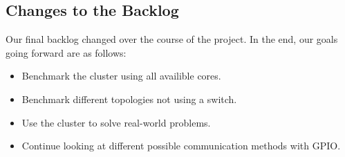 \subsection{Changes to the Backlog}

Our final backlog changed over the course of the project. In the end, our goals going forward are as follows:

\begin{itemize}
	\item Benchmark the cluster using all availible cores.
	\item Benchmark different topologies not using a switch.
	\item Use the cluster to solve real-world problems.
	\item Continue looking at different possible communication methods with GPIO.
\end{itemize}



